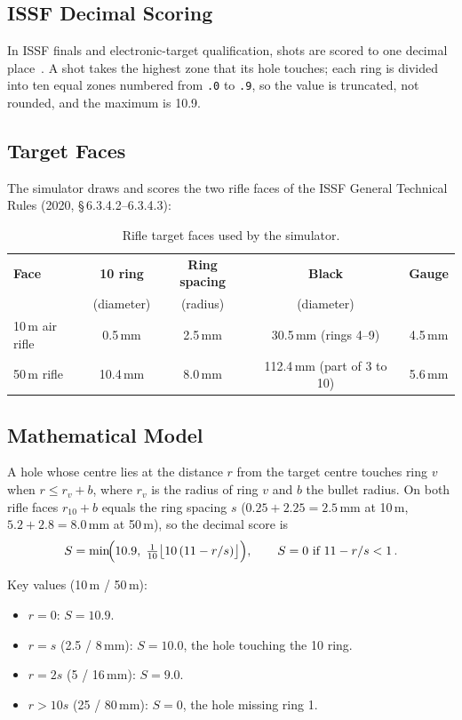 \documentclass[11pt]{article}
\begin{document}
\subsection{ISSF Decimal Scoring}
In ISSF finals and electronic-target qualification, shots are scored
to one decimal place~\cite{issf}.  A shot takes the highest zone that
its hole touches; each ring is divided into ten equal zones numbered
from \texttt{.0} to \texttt{.9}, so the value is truncated, not
rounded, and the maximum is 10.9.

\subsection{Target Faces}
The simulator draws and scores the two rifle faces of the ISSF
General Technical Rules (2020, \S\,6.3.4.2--6.3.4.3):

\begin{table}[H]
\centering\small
\begin{tabular}{@{}lcccc@{}}
\toprule
\textbf{Face} & \textbf{10 ring} & \textbf{Ring spacing} & \textbf{Black} & \textbf{Gauge} \\
 & (diameter) & (radius) & (diameter) & \\
\midrule
10\,m air rifle & 0.5\,mm  & 2.5\,mm & 30.5\,mm (rings 4--9)  & 4.5\,mm \\
50\,m rifle     & 10.4\,mm & 8.0\,mm & 112.4\,mm (part of 3 to 10) & 5.6\,mm \\
\bottomrule
\end{tabular}
\caption{Rifle target faces used by the simulator.}\label{tab:faces}
\end{table}

\subsection{Mathematical Model}
A hole whose centre lies at the distance $r$ from the target centre
touches ring $v$ when $r \leq r_v + b$, where $r_v$ is the radius of
ring $v$ and $b$ the bullet radius.  On both rifle faces $r_{10} + b$
equals the ring spacing $s$ ($0.25 + 2.25 = 2.5$\,mm at 10\,m,
$5.2 + 2.8 = 8.0$\,mm at 50\,m), so the decimal score is
\begin{equation}\label{eq:score}
  S = \min\!\Bigl(10.9,\;\tfrac{1}{10}\bigl\lfloor 10\,(11 - r/s)\bigr\rfloor\Bigr),
  \qquad S = 0 \ \text{if}\ 11 - r/s < 1\,.
\end{equation}

\noindent Key values (10\,m / 50\,m):
\begin{itemize}[nosep]
  \item $r = 0$: $S = 10.9$.
  \item $r = s$ (2.5 / 8\,mm): $S = 10.0$, the hole touching the 10 ring.
  \item $r = 2s$ (5 / 16\,mm): $S = 9.0$.
  \item $r > 10s$ (25 / 80\,mm): $S = 0$, the hole missing ring 1.
\end{itemize}
\end{document}
